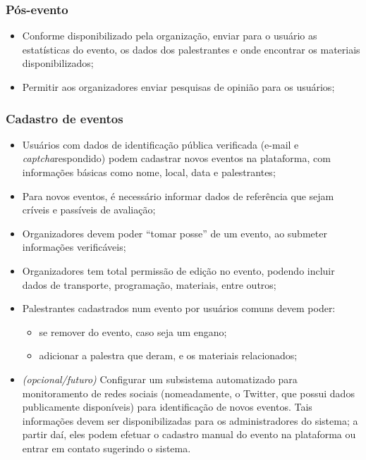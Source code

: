\documentclass[12pt,a4paper,twoside,hyphens,english,brazil]{abntex2}
\begin{document}
\subsubsection*{Pós-evento}
\begin{itemize}
	\item Conforme disponibilizado pela organização, enviar para o usuário as estatísticas do evento, os dados dos palestrantes e onde encontrar os materiais disponibilizados;
	\item Permitir aos organizadores enviar pesquisas de opinião para os usuários;
\end{itemize}

\subsubsection*{Cadastro de eventos}
\begin{itemize}
	\item Usuários com dados de identificação pública verificada (e-mail e \emph{captcha}\footnotemark respondido) podem cadastrar novos eventos na plataforma, com informações básicas como nome, local, data e palestrantes;
	\item Para novos eventos, é necessário informar dados de referência que sejam críveis e passíveis de avaliação;
	\item Organizadores devem poder ``tomar posse'' de um evento, ao submeter informações verificáveis;
	\item Organizadores tem total permissão de edição no evento, podendo incluir dados de transporte, programação, materiais, entre outros;
	\item Palestrantes cadastrados num evento por usuários comuns devem poder:
		\begin{itemize}
			\item se remover do evento, caso seja um engano;
			\item adicionar a palestra que deram, e os materiais relacionados;
		\end{itemize}
	\item \textit{(opcional/futuro)} Configurar um subsistema automatizado para monitoramento de redes sociais (nomeadamente, o Twitter, que possui dados publicamente disponíveis) para identificação de novos eventos. Tais informações devem ser disponibilizadas para os administradores do sistema; a partir daí, eles podem efetuar o cadastro manual do evento na plataforma ou entrar em contato sugerindo o sistema.
\end{itemize}
\end{document}
